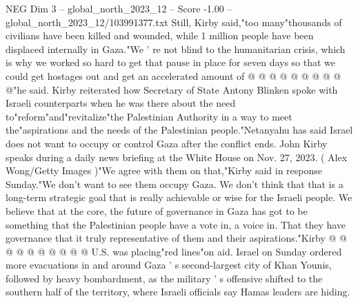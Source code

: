 \begin{textsample}{NEG Dim 3 – global\_north\_2023\_12 – Score -1.00 – global\_north\_2023\_12/103991377.txt}
Still, Kirby said,"too many"thousands of civilians have been killed and wounded, while 1 million people have been displaced internally in Gaza."We ' re not blind to the humanitarian crisis, which is why we worked so hard to get that pause in place for seven days so that we could get hostages out and get an accelerated amount of @ @ @ @ @ @ @ @ @ @"he said.
Kirby reiterated how Secretary of State Antony Blinken spoke with Israeli counterparts when he was there about the need to"reform"and"revitalize"the Palestinian Authority in a way to meet the"aspirations and the needs of the Palestinian people."Netanyahu has said Israel does not want to occupy or control Gaza after the conflict ends.
John Kirby speaks during a daily news briefing at the White House on Nov. 27, 2023. ( Alex Wong/Getty Images )"We agree with them on that,"Kirby said in response Sunday."We don't want to see them occupy Gaza.
We don't think that that is a long-term strategic goal that is really achievable or wise for the Israeli people.
We believe that at the core, the future of governance in Gaza has got to be something that the Palestinian people have a vote in, a voice in.
That they have governance that it truly representative of them and their aspirations."Kirby @ @ @ @ @ @ @ @ @ @ U.S. was placing"red lines"on aid.
Israel on Sunday ordered more evacuations in and around Gaza ' s second-largest city of Khan Younis, followed by heavy bombardment, as the military ' s offensive shifted to the southern half of the territory, where Israeli officials say Hamas leaders are hiding.

\end{textsample}
